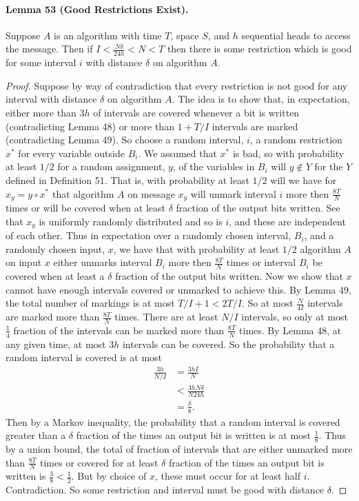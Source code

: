 \paragraph{Lemma 53 (Good Restrictions Exist).} Suppose $A$ is an algorithm with time $T$, space $S$, and $h$ sequential heads to access the message.
Then if $I<\frac{N\delta}{24h}<N<T$ then there is some restriction which is good for some interval $i$ with distance $\delta$ on algorithm $A$.
\begin{proof}
Suppose by way of contradiction that every restriction is not good for any interval with distance $\delta$ on algorithm $A$. The idea is to show that, in expectation, either more than $3h$ of intervals are covered whenever a bit is written (contradicting Lemma 48) or more than $1+T/I$ intervals are marked (contradicting Lemma 49).
So choose a random interval, $i$, a random restriction $x^*$ for every variable outside $B_i$. We assumed that $x^*$ is bad, so with probability at least $1/2$ for a random assignment, $y$, of the variables in $B_i$ will $y\notin Y$ for the $Y$ defined in Definition 51. That is, with probability at least $1/2$ will we have for $x_y=y\circ x^*$ that algorithm $A$ on message $x_y$ will unmark interval $i$ more then $\frac{8T}N$ times or will be covered when at least $\delta$ fraction of the output bits written.
See that $x_y$ is uniformly randomly distributed and so is $i$, and these are independent of each other. Thus in expectation over a randomly chosen interval, $B_i$, and a randomly chosen input, $x$, we have that with probability at least $1/2$ algorithm $A$ on input $x$ either unmarks interval $B_i$ more then $\frac{8T}N$ times or interval $B_i$ be covered when at least a $\delta$ fraction of the output bits written. Now we show that $x$ cannot have enough intervals covered or unmarked to achieve this.
By Lemma 49, the total number of markings is at most $T/I+1<2T/I$. So at most $\frac N{4I}$ intervals are marked more than $\frac{8T}N$ times. There are at least $N/I$ intervals, so only at most $\frac14$ fraction of the intervals can be marked more than $\frac{8T}N$ times.
By Lemma 48, at any given time, at most $3h$ intervals can be covered. So the probability that a random interval is covered is at most
\begin{align*}\frac{3h}{N/I}&=\frac{3hI}N\\&<\frac{3hN\delta}{N24h}\\&=\frac\delta8.\end{align*}
Then by a Markov inequality, the probability that a random interval is covered greater than a $\delta$ fraction of the times an output bit is written is at most $\frac18$.
Thus by a union bound, the total of fraction of intervals that are either unmarked more than $\frac{8T}N$ times or covered for at least $\delta$ fraction of the times an output bit is written is $\frac38<\frac12$. But by choice of $x$, these must occur for at least half $i$. Contradiction. So some restriction and interval must be good with distance $\delta$.
\end{proof}
